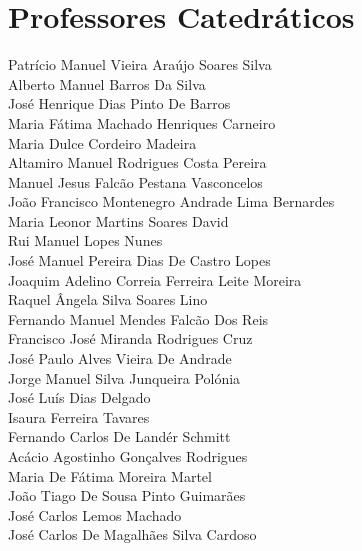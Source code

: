 \chapter*{Professores Catedráticos}
Patrício Manuel Vieira Araújo Soares Silva \\ 
Alberto Manuel Barros Da Silva\\ 
José Henrique Dias Pinto De Barros\\ 
Maria Fátima Machado Henriques Carneiro \\ 
Maria Dulce Cordeiro Madeira\\ 
Altamiro Manuel Rodrigues Costa Pereira\\ 
Manuel Jesus Falcão Pestana Vasconcelos\\ 
João Francisco Montenegro Andrade Lima Bernardes \\ 
Maria Leonor Martins Soares David\\ 
Rui Manuel Lopes Nunes\\ 
José Manuel Pereira Dias De Castro Lopes\\ 
Joaquim Adelino Correia Ferreira Leite Moreira \\ 
Raquel Ângela Silva Soares Lino\\ 
Fernando Manuel Mendes Falcão Dos Reis\\ 
Francisco José Miranda Rodrigues Cruz\\ 
José Paulo Alves Vieira De Andrade\\ 
Jorge Manuel Silva Junqueira Polónia\\ 
José Luís Dias Delgado\\ 
Isaura Ferreira Tavares\\ 
Fernando Carlos De Landér Schmitt\\ 
Acácio Agostinho Gonçalves Rodrigues\\ 
Maria De Fátima Moreira Martel\\ 
João Tiago De Sousa Pinto Guimarães\\ 
José Carlos Lemos Machado\\ 
José Carlos De Magalhães Silva Cardoso